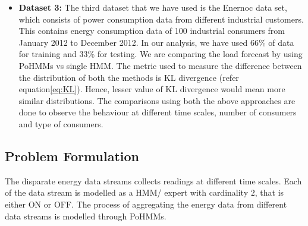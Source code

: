 \documentclass{acm_proc_article-sp}
\begin{document}
\begin{itemize}
\item \textbf{Dataset 3:} The third dataset that we have used is the Enernoc data set, which consists of power consumption data from different industrial customers. This contains energy consumption data of 100 industrial consumers from January 2012 to December 2012. In our analysis, we have used 66\% of data for training and 33\% for testing. We are comparing the load forecast by using PoHMMs vs single HMM. The metric used to measure the difference between the distribution of both the methods is KL divergence (refer equation\ref{eq:KL}). Hence, lesser value of KL divergence would mean more similar distributions. The comparisons using both the above approaches are done to observe the behaviour at different time scales, number of consumers and type of consumers.
\end{itemize}


\subsection{Problem Formulation}
The disparate energy data streams collects readings at different time scales. Each of the data stream is modelled as a HMM/ expert with cardinality $2$, that is either ON or OFF. The process of aggregating the energy data from different data streams is modelled through PoHMMs. 
\end{document}
